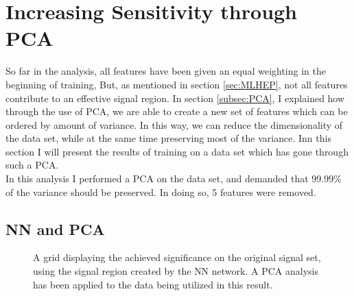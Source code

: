 \section{Increasing Sensitivity through PCA}
So far in the analysis, all features have been given an equal weighting in the beginning of training,
But, as mentioned in section \ref{sec:MLHEP}, not all features contribute to an effective signal 
region. In section \ref{subsec:PCA}, I explained how through the use of \ac{PCA}, we are able to 
create a new set of features which can be ordered by amount of variance. In this way, we can reduce
the dimensionality of the data set, while at the same time preserving most of the variance. Inn this 
section I will present the results of training on a data set which has gone through such a \ac{PCA}.
\\
In this analysis I performed a \ac{PCA} on the data set, and demanded that $99.99\%$ of the variance 
should be preserved. In doing so, 5 features were removed. 
\subsection{NN and PCA}
\begin{figure}
    \caption{A grid displaying the achieved significance on the original signal set, using the signal region 
    created by the \ac{NN} network. A \ac{PCA} analysis has been applied to the data being utilized in this result.}
    \label{fig:NNPCAGridSig}
\end{figure}

